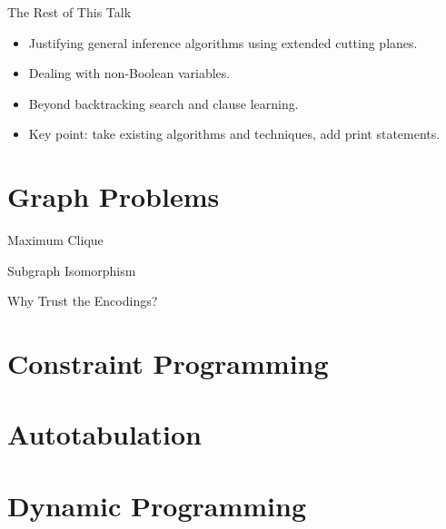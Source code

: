 \documentclass[aspectratio=169,compress,10pt]{beamer}
\begin{document}
\begin{frame}{The Rest of This Talk}
    \begin{itemize}
        \item Justifying general inference algorithms using extended cutting planes.
        \item Dealing with non-Boolean variables.
        \item Beyond backtracking search and clause learning.
        \item Key point: take existing algorithms and techniques, add print statements.
    \end{itemize}
\end{frame}

\section{Graph Problems}

\begin{frame}{Maximum Clique}
\end{frame}

\begin{frame}{Subgraph Isomorphism}
\end{frame}

\begin{frame}{Why Trust the Encodings?}
\end{frame}

\section{Constraint Programming}

\section{Autotabulation}

\section{Dynamic Programming}
\end{document}
